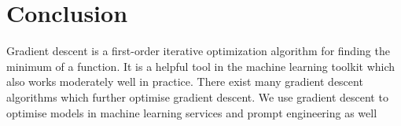 \documentclass[12pt]{article}
\begin{document}
\section{Conclusion}
Gradient descent is a first-order iterative optimization algorithm for finding the minimum of a function. It is a helpful tool in the machine learning toolkit which also works moderately well in practice. There exist many gradient descent algorithms\cite{graddesc} which further optimise gradient descent. We use gradient descent to optimise models in machine learning services and prompt engineering as well


\end{document}
